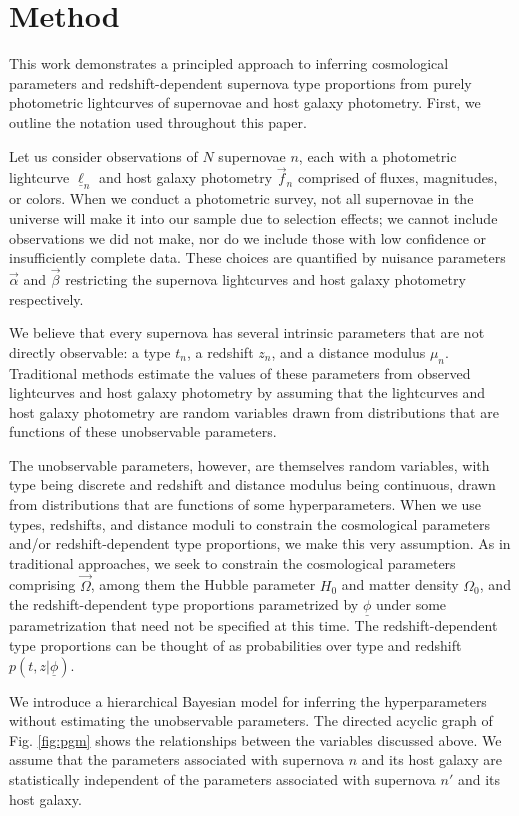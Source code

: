 \documentclass[12pt, onecolumn]{emulateapj}
\newcommand{\textul}{\underline}
\begin{document}
\section{Method}
\label{sec:meth}

This work demonstrates a principled approach to inferring cosmological parameters and redshift-dependent supernova type proportions from purely photometric lightcurves of supernovae and host galaxy photometry.  First, we outline the notation used throughout this paper.

Let us consider observations of $N$ supernovae $n$, each with a photometric lightcurve $\textul{\ell}_{n}$ and host galaxy photometry $\vec{f}_{n}$ comprised of fluxes, magnitudes, or colors.  When we conduct a photometric survey, not all supernovae in the universe will make it into our sample due to selection effects; we cannot include observations we did not make, nor do we include those with low confidence or insufficiently complete data.  These choices are quantified by nuisance parameters $\vec{\alpha}$ and $\vec{\beta}$ restricting the supernova lightcurves and host galaxy photometry respectively.  

We believe that every supernova has several intrinsic parameters that are not directly observable: a type $t_{n}$, a redshift $z_{n}$, and a distance modulus $\mu_{n}$.   Traditional methods estimate the values of these parameters from observed lightcurves and host galaxy photometry by assuming that the lightcurves and host galaxy photometry are random variables drawn from distributions that are functions of these unobservable parameters.
 
The unobservable parameters, however, are themselves random variables, with type being discrete and redshift and distance modulus being continuous, drawn from distributions that are functions of some hyperparameters.  When we use types, redshifts, and distance moduli to constrain the cosmological parameters and/or redshift-dependent type proportions, we make this very assumption.  As in traditional approaches, we seek to constrain the cosmological parameters comprising $\vec{\Omega}$, among them the Hubble parameter $H_{0}$ and matter density $\Omega_{0}$, and the redshift-dependent type proportions parametrized by $\textul{\phi}$ under some parametrization that need not be specified at this time.  The redshift-dependent type proportions can be thought of as probabilities over type and redshift $p(t, z | \textul{\phi})$.

We introduce a hierarchical Bayesian model for inferring the hyperparameters without estimating the unobservable parameters.  The directed acyclic graph of Fig. \ref{fig:pgm} shows the relationships between the variables discussed above.  We assume that the parameters associated with supernova $n$ and its host galaxy are statistically independent of the parameters associated with supernova $n'$ and its host galaxy.
\end{document}
